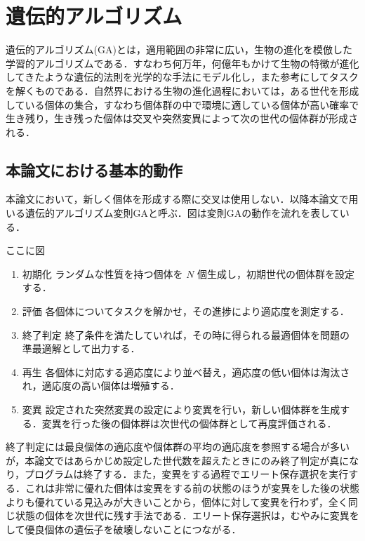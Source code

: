 \section{遺伝的アルゴリズム}
遺伝的アルゴリズム(GA)とは，適用範囲の非常に広い，生物の進化を模倣した学習的アルゴリズムである\cite{遺伝的アルゴリズム}．すなわち何万年，何億年もかけて生物の特徴が進化してきたような遺伝的法則を光学的な手法にモデル化し，また参考にしてタスクを解くものである．自然界における生物の進化過程においては，ある世代を形成している個体の集合，すなわち個体群の中で環境に適している個体が高い確率で生き残り，生き残った個体は交叉や突然変異によって次の世代の個体群が形成される．

\subsection{本論文における基本的動作}
本論文において，新しく個体を形成する際に交叉は使用しない．以降本論文で用いる遺伝的アルゴリズム変則GAと呼ぶ．図は変則GAの動作を流れを表している．

ここに図

\begin{enumerate}
    \item 初期化
    ランダムな性質を持つ個体を $ N $ 個生成し，初期世代の個体群を設定する．

    \item 評価
    各個体についてタスクを解かせ，その進捗により適応度を測定する．

    \item 終了判定
    終了条件を満たしていれば，その時に得られる最適個体を問題の準最適解として出力する．

    \item 再生
    各個体に対応する適応度により並べ替え，適応度の低い個体は淘汰され，適応度の高い個体は増殖する．

    \item 変異
    設定された突然変異の設定により変異を行い，新しい個体群を生成する．変異を行った後の個体群は次世代の個体群として再度評価される．
\end{enumerate}

終了判定には最良個体の適応度や個体群の平均の適応度を参照する場合が多いが，本論文ではあらかじめ設定した世代数を超えたときにのみ終了判定が真になり，プログラムは終了する．また，変異をする過程でエリート保存選択を実行する．これは非常に優れた個体は変異をする前の状態のほうが変異をした後の状態よりも優れている見込みが大きいことから，個体に対して変異を行わず，全く同じ状態の個体を次世代に残す手法である．エリート保存選択は，むやみに変異をして優良個体の遺伝子を破壊しないことにつながる．
